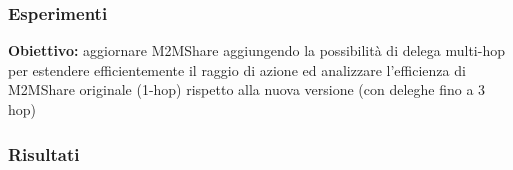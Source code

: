 \documentclass{beamer}
\begin{document}
\begin{frame}
\frametitle{Esperimenti}
\label{descrizione multi hop}
\textbf{Obiettivo:} aggiornare M2MShare aggiungendo la possibilità di delega multi-hop per estendere efficientemente il raggio di azione ed analizzare l’efficienza di M2MShare originale (1-hop) rispetto alla nuova versione  (con deleghe fino a 3 hop)
\end{frame}

\begin{frame}
\frametitle{Risultati}
\label{mappa multi hop}
\begin{figure}[htbp]
\centering%
\vspace{-30pt}%
\setcounter{subfigure}{0}%
\qquad
\vspace{-10pt}%
\pause
{}\qquad

\end{figure}
\end{frame}
\end{document}

